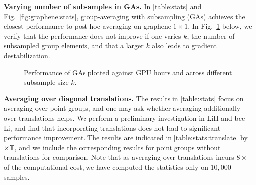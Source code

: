 \vspace{.2em}

\textbf{Varying number of subsamples in GAs.} In \cref{table:stats} and Fig.~\ref{fig:graphene:stats}, group-averaging with subsampling (GAs) achieves the closest performance to post hoc averaging on graphene $1 \times 1$. In Fig.~\ref{fig:subsample:additional} below, we verify that the performance does not improve if one varies $k$, the number of subsampled group elements, and that a larger $k$ also leads to gradient destabilization.

\begin{figure}[h]
    \centering
    \vspace{-.6em}
    \caption{Performance of GAs plotted against GPU hours and across different subsample size $k$.
    }
    \vspace{.5em}
    \label{fig:subsample:additional}
\end{figure}

\vspace{.2em}

\textbf{Averaging over diagonal translations.} The results in \cref{table:stats} focus on averaging over point groups, and one may ask whether averaging additionally over translations helps. We perform a preliminary investigation in LiH and bcc-Li, and find that incorporating translations does not lead to significant performance improvement. The results are indicated in \cref{table:stats:translate} by $\times \mathbb{T}$, and we include the corresponding results for point groups without translations for comparison. Note that as averaging over translations incurs $8 \times$ of the computational cost, we have computed the statistics only on $10,000$ samples.



